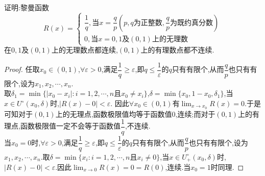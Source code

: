 \begin{example}
    证明:黎曼函数
    \begin{equation*}
        R(x)=\begin{cases}
            \dfrac{1}{q},\text{当}x=\dfrac{q}{p}(p,q\text{为正整数},\dfrac{q}{p}\text{为既约真分数})\\
            0,\text{当}x=0,1\text{及}(0,1)\text{上的无理数}
        \end{cases}
    \end{equation*}
    在$0,1$及$(0,1)$上的无理数点都连续,$(0,1)$上的有理数点都不连续.
\end{example}
\begin{proof}
    任取$x_0\in(0,1)$,$\forall \varepsilon>0$,满足$\dfrac{1}{q}\geq\varepsilon$,即$q\leq\dfrac{1}{\varepsilon}$的$q$只有有限个,从而$\dfrac{q}{p}$也只有有限个,设为$x_1,x_2,\cdots,x_n$.\\
    取$\delta_1=\min\{|x_0-x_i|:i=1,2,\cdots,n\text{且}x_0\neq x_i\}$,$\delta=\min\{x_0,1-x_0,\delta_1\}$,当$x\in U^{\circ}(x_0,\delta)$时,$|R(x)-0|<\varepsilon$.
    因此$\forall x_0\in(0,1)\text{有}\displaystyle\lim_{x\to x_0}R(x)=0$.于是可知对于$(0,1)$上的无理点,函数极限值均等于函数值$0$,连续;而对于$(0,1)$上的有理点,函数极限值一定不会等于函数值$\dfrac{1}{q}$,不连续.\\
    当$x_0=0$时,$\forall \varepsilon>0$,满足$\dfrac{1}{q}\geq\varepsilon$,即$q\leq\dfrac{1}{\varepsilon}$的$q$只有有限个,从而$\dfrac{q}{p}$也只有有限个,设为$x_1,x_2,\cdots,x_n$.取$\delta=\min\{x_i:i=1,2,\cdots,n\text{且}x_i\neq 0\}$,当$x\in U^{\circ}_{+}(x_0,\delta)$时,$|R(x)-0|<\varepsilon$.因此$\displaystyle\lim_{x\to 0}R(x)=0=R(0)$,连续.当$x_0=1$时同理.
\end{proof}

